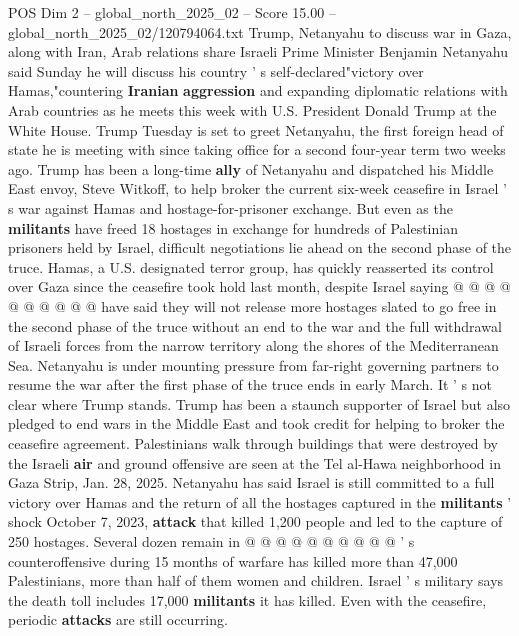 \begin{textsample}{POS Dim 2 – global\_north\_2025\_02 – Score 15.00 – global\_north\_2025\_02/120794064.txt}  \label{ex:f2_pos_431}
Trump, Netanyahu to discuss war in Gaza, along with Iran, Arab relations share Israeli Prime Minister Benjamin Netanyahu said Sunday he will discuss his country ' s self-declared"victory over Hamas,"countering \textbf{Iranian} \textbf{aggression} and expanding diplomatic relations with Arab countries as he meets this week with U.S.
President Donald Trump at the White House.
Trump Tuesday is set to greet Netanyahu, the first foreign head of state he is meeting with since taking office for a second four-year term two weeks ago.
Trump has been a long-time \textbf{ally} of Netanyahu and dispatched his Middle East envoy, Steve Witkoff, to help broker the current six-week ceasefire in Israel ' s war against Hamas and hostage-for-prisoner exchange.
But even as the \textbf{militants} have freed 18 hostages in exchange for hundreds of Palestinian prisoners held by Israel, difficult negotiations lie ahead on the second phase of the truce.
Hamas, a U.S. designated terror group, has quickly reasserted its control over Gaza since the ceasefire took hold last month, despite Israel saying @ @ @ @ @ @ @ @ @ @ have said they will not release more hostages slated to go free in the second phase of the truce without an end to the war and the full withdrawal of Israeli forces from the narrow territory along the shores of the Mediterranean Sea.
Netanyahu is under mounting pressure from far-right governing partners to resume the war after the first phase of the truce ends in early March.
It ' s not clear where Trump stands.
Trump has been a staunch supporter of Israel but also pledged to end wars in the Middle East and took credit for helping to broker the ceasefire agreement.
Palestinians walk through buildings that were destroyed by the Israeli \textbf{air} and ground offensive are seen at the Tel al-Hawa neighborhood in Gaza Strip, Jan. 28, 2025.
Netanyahu has said Israel is still committed to a full victory over Hamas and the return of all the hostages captured in the \textbf{militants} ' shock October 7, 2023, \textbf{attack} that killed 1,200 people and led to the capture of 250 hostages.
Several dozen remain in @ @ @ @ @ @ @ @ @ @ ' s counteroffensive during 15 months of warfare has killed more than 47,000 Palestinians, more than half of them women and children.
Israel ' s military says the death toll includes 17,000 \textbf{militants} it has killed.
Even with the ceasefire, periodic \textbf{attacks} are still occurring.

\end{textsample}

